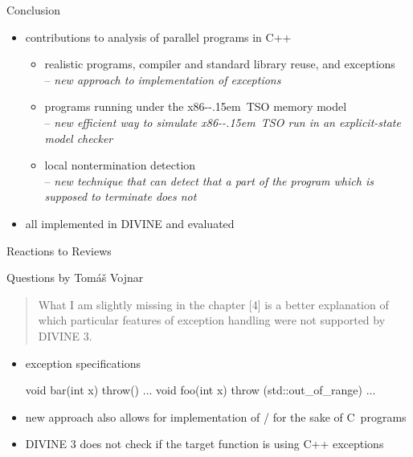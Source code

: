 \documentclass[aspectratio=169, fi]{paradise-slide}
\newcommand{\xtso}{\mbox{x86-\kern-.15em TSO}\xspace}
\newenvironment{prespart}[1]{%
  \begin{frame}{}%
    \centering
      {\Large #1} \par\bigskip\bigskip%
}{%
  \end{frame}%
}
\newcommand{\rquote}[1]{\begin{quote}#1\end{quote}\bigskip\setlength{\leftmargini}{1em}}
\begin{document}
\begin{prespart}{Conclusion}
  \begin{itemize}
    \item contributions to analysis of parallel programs in C++
      \begin{itemize}
        \item realistic programs, compiler and standard library reuse, and exceptions
          \\ – \emph{new approach to implementation of exceptions}
        \item programs running under the \xtso memory model
          \\ – \emph{new efficient way to simulate \xtso run in an explicit-state model checker}
        \item local nontermination detection
          \\ – \emph{new technique that can detect that a part of the program which is supposed to
          terminate does not}
      \end{itemize}
    \item all implemented in DIVINE and evaluated
  \end{itemize}
\end{prespart}

\def\insertframenumber{A}
\begin{frame}[noframenumbering]{}
    \centering
      {\Large Reactions to Reviews}
\end{frame}

\def\rname{Tomáš Vojnar}
\def\qtitle{Questions by \rname}

\begin{frame}{\qtitle}
\rquote{What I am slightly missing in the chapter [4] is a better explanation of which particular features
of exception handling were not supported by DIVINE 3.}

  \begin{itemize}
    \item exception specifications
      \begin{cppcode}
        void bar(int x) throw() { ... }
        void foo(int x) throw (std::out_of_range) { ... }
      \end{cppcode}
    \item new approach also allows for implementation of / for the sake of
      C~programs
    \item DIVINE 3 does not check if the target function is using C++ exceptions
  \end{itemize}
\end{frame}
\end{document}
